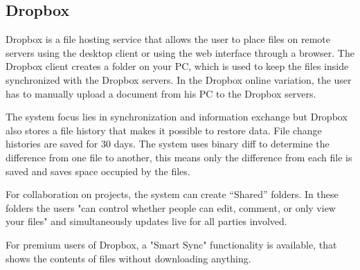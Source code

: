 \subsection{Dropbox}
Dropbox is a file hosting service that allows the user to place files on remote servers using the desktop client or using the web interface through a browser.
The Dropbox client creates a folder on your PC, which is used to keep the files inside synchronized with the Dropbox servers. In the Dropbox online variation, the user has to manually upload a document from his PC to the Dropbox servers.

The system focus lies in synchronization and information exchange but Dropbox also stores a file history that makes it possible to restore data.
File change histories are saved for 30 days.
The system uses binary diff to determine the difference from one file to another, this means only the difference from each file is saved and saves space occupied by the files.\cite{DropboxDiff}

For collaboration on projects, the system can create “Shared” folders. In these folders the users "can control whether people can edit, comment, or only view your files" and simultaneously updates live for all parties involved.\cite{DropboxShared}

For premium users of Dropbox, a "Smart Sync" functionality is available, that shows the contents of files without downloading anything.\cite{DropboxSmartSync}
